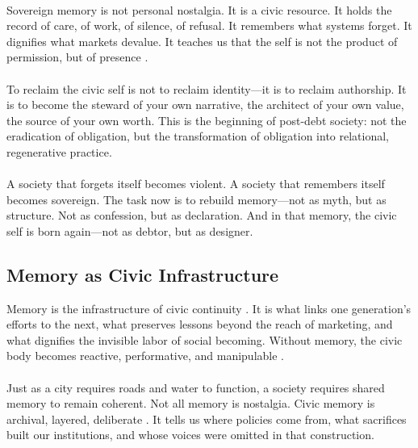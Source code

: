 \documentclass[12pt]{article}
\begin{document}
\paragraph{}Sovereign memory is not personal nostalgia. It is a civic resource. It holds the record of care, of work, of silence, of refusal. It remembers what systems forget. It dignifies what markets devalue. It teaches us that the self is not the product of permission, but of presence \cite{boyer2017civic}.

\paragraph{}To reclaim the civic self is not to reclaim identity—it is to reclaim authorship. It is to become the steward of your own narrative, the architect of your own value, the source of your own worth. This is the beginning of post-debt society: not the eradication of obligation, but the transformation of obligation into relational, regenerative practice.

\paragraph{}A society that forgets itself becomes violent. A society that remembers itself becomes sovereign. The task now is to rebuild memory—not as myth, but as structure. Not as confession, but as declaration. And in that memory, the civic self is born again—not as debtor, but as designer.

\subsection{Memory as Civic Infrastructure}

Memory is the infrastructure of civic continuity \cite{simone2004people}. It is what links one generation's efforts to the next, what preserves lessons beyond the reach of marketing, and what dignifies the invisible labor of social becoming. Without memory, the civic body becomes reactive, performative, and manipulable \cite{ahmed2004cultural}.

\paragraph{}Just as a city requires roads and water to function, a society requires shared memory to remain coherent. Not all memory is nostalgia. Civic memory is archival, layered, deliberate \cite{boyer2017civic}. It tells us where policies come from, what sacrifices built our institutions, and whose voices were omitted in that construction.
\end{document}
